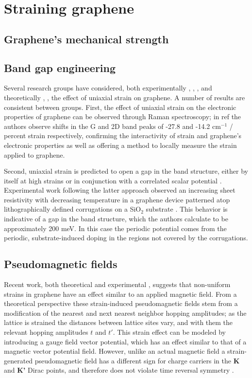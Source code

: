 \documentclass[edeposit,fullpage,draftthesis]{uiucthesis2009}
\begin{document}
        
    \section{Straining graphene}
    
        \subsection{Graphene's mechanical strength}
    
        \subsection{Band gap engineering}
        Several research groups have considered, both experimentally \cite{Ni2008}, \cite{Kim2009}, \cite{Mohiuddin2009}, \cite{Zang2013} and theoretically \cite{Pereira2009}, \cite{Low2011}, the effect of uniaxial strain on graphene. A number of results are consistent between groups. First, the effect of uniaxial strain on the electronic properties of graphene can be observed through Raman spectroscopy; in ref \cite{Ni2008} the authors observe shifts in the G and 2D band peaks of -27.8 and -14.2 cm$^{-1}$ / percent strain respectively, confirming the interactivity of strain and graphene's electronic properties as well as offering a method to locally measure the strain applied to graphene.
    
        Second, uniaxial strain is predicted to open a gap in the band structure, either by itself at high strains \cite{Pereira2009} or in conjunction with a correlated scalar potential \cite{Low2011}. Experimental work following the latter approach observed an increasing sheet resistivity with decreasing temperature in a graphene device patterned atop lithographically defined corrugations on a SiO$_2$ substrate \cite{Lee2013}. This behavior is indicative of a gap in the band structure, which the authors calculate to be approximately 200 meV. In this case the periodic potential comes from the periodic, substrate-induced doping in the regions not covered by the corrugations.
    
        \subsection{Pseudomagnetic fields}
        Recent work, both theoretical \cite{Guinea2009} and experimental \cite{Levy2010}, \cite{Yan2012} suggests that non-uniform strains in graphene have an effect similar to an applied magnetic field. From a theoretical perspective these strain-induced pseudomagnetic fields stem from a modification of the nearest and next nearest neighbor hopping amplitudes; as the lattice is strained the distances between lattice sites vary, and with them the relevant hopping amplitudes $t$ and $t'$. This strain effect can be modeled by introducing a gauge field vector potential, which has an effect similar to that of a magnetic vector potential field. However, unlike an actual magnetic field a strain-generated pseudomagnetic field has a different sign for charge carriers in the \textbf{K} and \textbf{K'} Dirac points, and therefore does not violate time reversal symmetry \cite{Guinea2009}.
    
\end{document}
